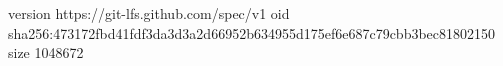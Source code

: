 version https://git-lfs.github.com/spec/v1
oid sha256:473172fbd41fdf3da3d3a2d66952b634955d175ef6e687c79cbb3bec81802150
size 1048672
